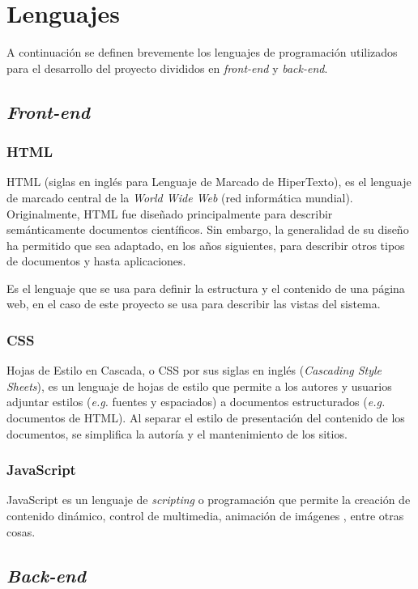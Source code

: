 \section{Lenguajes}
A continuación se definen brevemente los lenguajes de programación utilizados para el desarrollo del proyecto divididos en \textit{front-end} y \textit{back-end}.

\subsection{\emph{Front-end}}
\subsubsection{HTML}
HTML (siglas en inglés para Lenguaje de Marcado de HiperTexto), es el lenguaje de marcado central de la \textit{World Wide Web} (red informática mundial). Originalmente, HTML fue diseñado principalmente para describir semánticamente documentos científicos. Sin embargo, la generalidad de su diseño ha permitido que sea adaptado, en los años siguientes, para describir otros tipos de documentos y hasta aplicaciones. \cite{htmlW3C}

Es el lenguaje que se usa para definir la estructura y el contenido de una página web, en el caso de este proyecto se usa para describir las vistas del sistema.

\subsubsection{CSS}
Hojas de Estilo en Cascada, o CSS por sus siglas en inglés (\textit{Cascading Style Sheets}), es un lenguaje de hojas de estilo que permite a los autores y usuarios adjuntar estilos (\textit{e.g.} fuentes y espaciados) a documentos estructurados (\textit{e.g.} documentos de HTML). Al separar el estilo de presentación del contenido de los documentos, se simplifica la autoría y el mantenimiento de los sitios. \cite{cssW3C}

\subsubsection{JavaScript}
JavaScript es un lenguaje de \textit{scripting} o programación que permite la creación de contenido dinámico, control de multimedia, animación de imágenes \cite{jsMozilla}, entre otras cosas.

\subsection{\emph{Back-end}}
